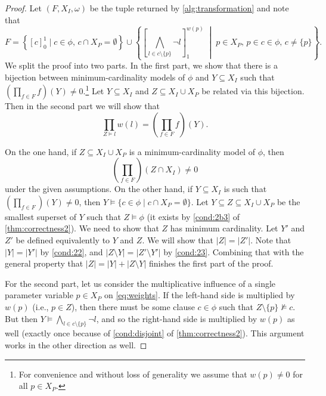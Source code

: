\begin{proof}
  Let $(F, X_I, \omega)$ be the tuple returned by \cref{alg:transformation} and
  note that
  \[
  F = \left\{ [c]_0^1 \mid c \in \phi \text{, } c \cap X_P = \emptyset \right\} \cup \left\{ \left[ \bigwedge_{l \in c \setminus \{ p \}} \neg l \right]_1^{w(p)} \;\middle|\; p \in X_P \text{, } p \in c \in \phi \text{, } c \ne \{ p \} \right\}.
  \]
  We split the proof into two parts. In the first part, we show that there is a bijection between minimum-cardinality models of $\phi$ and $Y \subseteq X_I$ such that $\left(\prod_{f \in F} f\right)(Y) \ne 0$.\footnote{For convenience and without loss of generality we assume that $w(p) \ne 0$ for all $p \in X_P$.} Let $Y \subseteq X_I$ and $Z \subseteq X_I \cup X_P$ be related via this bijection. Then in the second part we will show that
  \begin{equation} \label{eq:weights}
    \prod_{Z \models l} w(l) = \left(\prod_{f \in F} f\right)(Y).
  \end{equation}

  On the one hand, if $Z \subseteq X_I \cup X_P$ is a minimum-cardinality model
  of $\phi$, then
  \[
  \left(\prod_{f \in F}\right)(Z \cap X_I) \ne 0
  \]
  under the given assumptions. On the other hand, if $Y \subseteq X_I$ is such that $\left(\prod_{f \in F}\right)(Y) \ne 0$, then $Y \models \{ c \in \phi \mid c \cap X_P = \emptyset \}$. Let $Y \subseteq Z \subseteq X_I \cup X_P$ be the smallest superset of $Y$ such that $Z \models \phi$ (it exists by \cref{cond:2b3} of \cref{thm:correctness2}). We need to show that $Z$ has minimum cardinality. Let $Y'$ and $Z'$ be defined equivalently to $Y$ and $Z$. We will show that $|Z| = |Z'|$. Note that $|Y| = |Y'|$ by \cref{cond:22}, and $|Z \setminus Y| = |Z' \setminus Y'|$ by \cref{cond:23}. Combining that with the general property that $|Z| = |Y| + |Z \setminus Y|$ finishes the first part of the proof.

  For the second part, let us consider the multiplicative influence of a single
  parameter variable $p \in X_P$ on \cref{eq:weights}. If the left-hand side is
  multiplied by $w(p)$ (i.e., $p \in Z$), then there must be some clause $c \in
  \phi$ such that $Z \setminus \{ p \} \not\models c$. But then $Y \models
  \bigwedge_{l \in c \setminus \{ p \}} \neg l$, and so the right-hand side is
  multiplied by $w(p)$ as well (exactly once because of \cref{cond:disjoint} of
  \cref{thm:correctness2}). This argument works in the other direction as well.
\end{proof}

